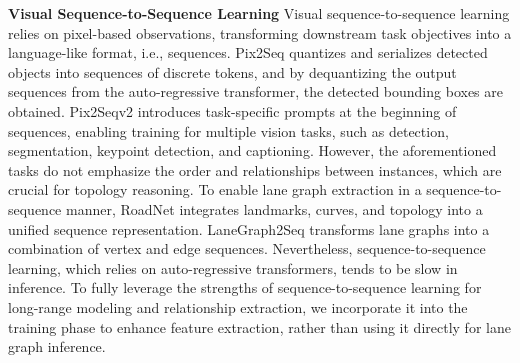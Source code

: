 \textbf{Visual Sequence-to-Sequence Learning}
Visual sequence-to-sequence learning relies on pixel-based observations, transforming downstream task objectives into a language-like format, i.e., sequences. Pix2Seq \cite{chen2021pix2seq} quantizes and serializes detected objects into sequences of discrete tokens, and by dequantizing the output sequences from the auto-regressive transformer, the detected bounding boxes are obtained. Pix2Seqv2 \cite{chen2022unified} introduces task-specific prompts at the beginning of sequences, enabling training for multiple vision tasks, such as detection, segmentation, keypoint detection, and captioning. However, the aforementioned tasks do not emphasize the order and relationships between instances, which are crucial for topology reasoning. To enable lane graph extraction in a sequence-to-sequence manner, RoadNet \cite{lu2023translating} integrates landmarks, curves, and topology into a unified sequence representation. LaneGraph2Seq \cite{peng2024lanegraph2seq} transforms lane graphs into a combination of vertex and edge sequences. Nevertheless, sequence-to-sequence learning, which relies on auto-regressive transformers, tends to be slow in inference. To fully leverage the strengths of sequence-to-sequence learning for long-range modeling and relationship extraction, we incorporate it into the training phase to enhance feature extraction, rather than using it directly for lane graph inference.